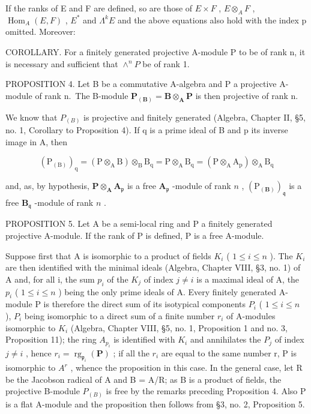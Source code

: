 If the ranks of E and F are defined, so are those of \(E \times F\) , \(E \otimes_{A} F\) , \(\operatorname{Hom}_{A}(E, F)\) , \(E^{*}\) and \(\Lambda^{k} E\) and the above equations also hold with the index p omitted. Moreover:

COROLLARY. For a finitely generated projective A-module P to be of rank n, it is necessary and sufficient that \(\wedge^{n}P\) be of rank 1.

PROPOSITION 4. Let B be a commutative A-algebra and P a projective A-module of rank n.~The B-module \(\mathbf{P}_{(\mathbf{B})} = \mathbf{B} \otimes_{\mathbf{A}} \mathbf{P}\) is then projective of rank n.

We know that \(P_{(B)}\) is projective and finitely generated (Algebra, Chapter II, §5, no. 1, Corollary to Proposition 4). If q is a prime ideal of B and p its inverse image in A, then

\[
\left(\mathrm{P} _ {(\mathrm{B})}\right) _ {\mathrm{q}} = \left(\mathrm{P} \otimes_ {\mathrm{A}} \mathrm{B}\right) \otimes_ {\mathrm{B}} \mathrm{B} _ {\mathrm{q}} = \mathrm{P} \otimes_ {\mathrm{A}} \mathrm{B} _ {\mathrm{q}} = \left(\mathrm{P} \otimes_ {\mathrm{A}} \mathrm{A} _ {\mathrm{p}}\right) \otimes_ {\mathrm{A}} \mathrm{B} _ {\mathrm{q}}
\]

and, as, by hypothesis, \(\mathbf{P} \otimes_{\mathbf{A}} \mathbf{A}_{\mathfrak{p}}\) is a free \(\mathbf{A}_{\mathfrak{p}}\) -module of rank \(n\) , \((\mathrm{P}_{(\mathbf{B})})_{\mathfrak{q}}\) is a free \(\mathbf{B}_{\mathfrak{q}}\) -module of rank \(n\) .

PROPOSITION 5. Let A be a semi-local ring and P a finitely generated projective A-module. If the rank of P is defined, P is a free A-module.

Suppose first that A is isomorphic to a product of fields \(K_{i}\) ( \(1 \leqslant i \leqslant n\) ). The \(K_{i}\) are then identified with the minimal ideals (Algebra, Chapter VIII, §3, no. 1) of A and, for all i, the sum \(p_{i}\) of the \(K_{j}\) of index \(j \neq i\) is a maximal ideal of A, the \(p_{i}\) ( \(1 \leqslant i \leqslant n\) ) being the only prime ideals of A. Every finitely generated A-module P is therefore the direct sum of its isotypical components \(P_{i}\) ( \(1 \leqslant i \leqslant n\) ), \(P_{i}\) being isomorphic to a direct sum of a finite number \(r_{i}\) of A-modules isomorphic to \(K_{i}\) (Algebra, Chapter VIII, §5, no. 1, Proposition 1 and no. 3, Proposition 11); the ring \(A_{p_{i}}\) is identified with \(K_{i}\) and annihilates the \(P_{j}\) of index \(j \neq i\) , hence \(r_{i} = \operatorname{rg}_{\mathfrak{p}_{i}}(\mathbf{P})\) ; if all the \(r_{i}\) are equal to the same number r, P is isomorphic to \(A^{r}\) , whence the proposition in this case. In the general case, let R be the Jacobson radical of A and B = A/R; as B is a product of fields, the projective B-module \(P_{(B)}\) is free by the remarks preceding Proposition 4. Also P is a flat A-module and the proposition then follows from §3, no. 2, Proposition 5.

